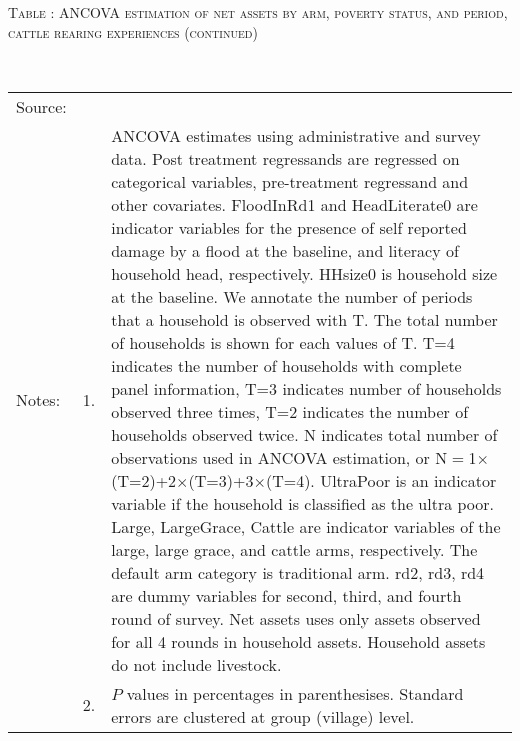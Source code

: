 \addtocounter{table}{-1}
\vspace{-1cm}\hspace{-1cm}\begin{minipage}[t]{14cm}
\hfil\textsc{\normalsize Table \thetable: ANCOVA estimation of net assets by arm, poverty status, and period, cattle rearing experiences (continued)\label{tab ANCOVA narrow net assets Experience timevarying poverty status 2}}\\
\setlength{\tabcolsep}{1pt}
\setlength{\baselineskip}{8pt}
\renewcommand{\arraystretch}{.52}
\hfil{}\\
\renewcommand{\arraystretch}{.8}
\setlength{\tabcolsep}{1pt}
\begin{tabular}{>{\hfill\scriptsize}p{1cm}<{}>{\hfill\scriptsize}p{.25cm}<{}>{\scriptsize}p{12cm}<{\hfill}}
Source:& \multicolumn{2}{l}{\scriptsize Estimated with GUK administrative and survey data.}\\
Notes: & 1. & ANCOVA estimates using administrative and survey data. Post treatment regressands are regressed on categorical variables, pre-treatment regressand and other covariates. \textsf{FloodInRd1} and \textsf{HeadLiterate0} are indicator variables for the presence of self reported damage by a flood at the baseline, and literacy of household head, respectively. \textsf{HHsize0} is household size at the baseline. We annotate the number of periods that a household is observed with \textsf{T}. The total number of households is shown for each values of \textsf{T}. \textsf{T=4} indicates the number of households with complete panel information, \textsf{T=3} indicates number of households observed three times, \textsf{T=2} indicates the number of households observed twice. \textsf{N} indicates total number of observations used in ANCOVA estimation, or \textsf{N$=$1$\times$(T=2)+2$\times$(T=3)+3$\times$(T=4)}.  \textsf{UltraPoor} is an indicator variable if the household is classified as the ultra poor. \textsf{Large}, \textsf{LargeGrace}, \textsf{Cattle} are indicator variables of the \textsf{large}, \textsf{large grace}, and \textsf{cattle} arms, respectively. The default arm category is \textsf{traditional} arm. \textsf{rd2, rd3, rd4} are dummy variables for second, third, and fourth round of survey. Net assets uses only assets observed for all 4 rounds in household assets. Household assets do not include livestock. \\
& 2. & $P$ values in percentages in parenthesises. Standard errors are clustered at group (village) level.
\end{tabular}
\end{minipage}


